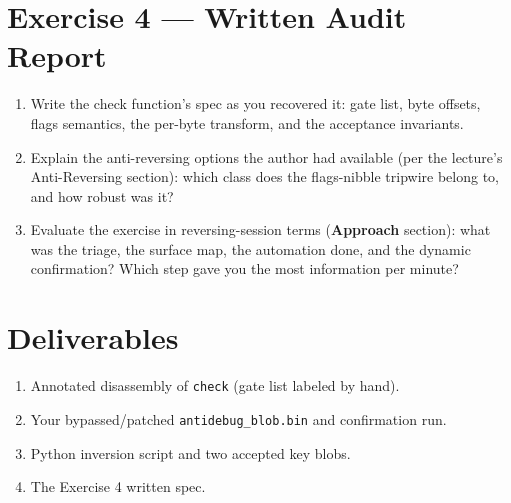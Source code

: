 \documentclass[12pt]{Training}
\begin{document}
\section*{Exercise 4 --- Written Audit Report}
\begin{enumerate}
    \item Write the check function's spec as you recovered it: gate list, byte offsets, flags semantics, the per-byte transform, and the acceptance invariants.
    \item Explain the anti-reversing options the author had available (per the lecture's Anti-Reversing section): which class does the flags-nibble tripwire belong to, and how robust was it?
    \item Evaluate the exercise in reversing-session terms (\textbf{Approach} section): what was the triage, the surface map, the automation done, and the dynamic confirmation? Which step gave you the most information per minute?
\end{enumerate}

\section*{Deliverables}
\begin{enumerate}
    \item Annotated disassembly of \lstinline{check} (gate list labeled by hand).
    \item Your bypassed/patched \lstinline{antidebug_blob.bin} and confirmation run.
    \item Python inversion script and two accepted key blobs.
    \item The Exercise 4 written spec.
\end{enumerate}
\end{document}
